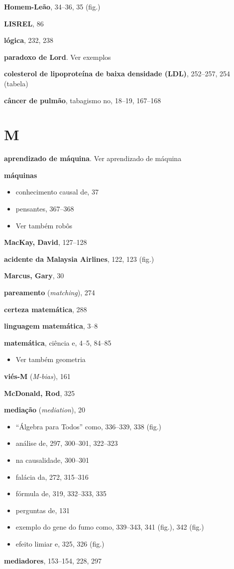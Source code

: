 \documentclass[11pt,a5paper,twoside]{book}
\begin{document}
\textbf{Homem-Leão}, 34–36, 35 (fig.)

\textbf{LISREL}, 86

\textbf{lógica}, 232, 238

\textbf{paradoxo de Lord}. Ver exemplos

\textbf{colesterol de lipoproteína de baixa densidade (LDL)}, 252–257, 254 (tabela)

\textbf{câncer de pulmão}, tabagismo no, 18–19, 167–168

\section{M}
\textbf{aprendizado de máquina}. Ver aprendizado de máquina

\textbf{máquinas}

\begin{itemize}
\item conhecimento causal de, 37
\item pensantes, 367–368
\item Ver também robôs
\end{itemize}
\textbf{MacKay, David}, 127–128

\textbf{acidente da Malaysia Airlines}, 122, 123 (fig.)

\textbf{Marcus, Gary}, 30

\textbf{pareamento} (\textit{matching}), 274

\textbf{certeza matemática}, 288

\textbf{linguagem matemática}, 3–8

\textbf{matemática}, ciência e, 4–5, 84–85

\begin{itemize}
\item Ver também geometria
\end{itemize}
\textbf{viés-M} (\textit{M-bias}), 161

\textbf{McDonald, Rod}, 325

\textbf{mediação} (\textit{mediation}), 20

\begin{itemize}
\item “Álgebra para Todos” como, 336–339, 338 (fig.)
\item análise de, 297, 300–301, 322–323
\item na causalidade, 300–301
\item falácia da, 272, 315–316
\item fórmula de, 319, 332–333, 335
\item perguntas de, 131
\item exemplo do gene do fumo como, 339–343, 341 (fig.), 342 (fig.)
\item efeito limiar e, 325, 326 (fig.)
\end{itemize}
\textbf{mediadores}, 153–154, 228, 297
\end{document}
